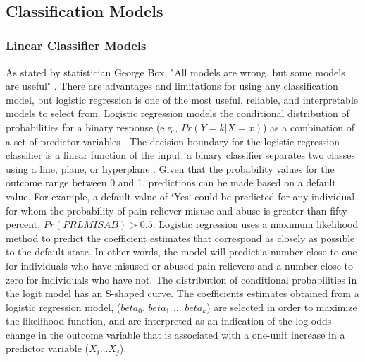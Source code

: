 \\\documentclass[sigconf]{acmart}
\begin{document}

\subsection{Classification Models}

\subsubsection{Linear Classifier Models}

As stated by statistician George Box, "All models are wrong, but some models 
are useful" \cite{box05}. There are advantages and limitations for using any 
classification model, but logistic regression is one of the most useful,
reliable, and interpretable models to select from. Logistic regression models 
the conditional distribution of probabilities for a binary response (e.g., 
$Pr(Y=k | X=x)$) as a combination of a set of predictor variables 
\cite{james13, raschka17}. The decision boundary for the logistic regression 
classifier is a linear function of the input; a binary classifier separates 
two classes using a line, plane, or hyperplane \cite{muller17}. Given that the 
probability values for the outcome range between 0 and 1, predictions can be 
made based on a default value. For example, a default value of `Yes` could be 
predicted for any individual for whom the probability of pain reliever misuse 
and abuse is greater than fifty-percent, $Pr(PRLMISAB) > 0.5$. Logistic regression 
uses a maximum likelihood method to predict the coefficient estimates that 
correspond as closely as possible to the default state. In other words, the 
model will predict a number close to one for individuals who have misused or 
abused pain relievers and a number close to zero for individuals who have 
not. The distribution of conditional probabilities in the logit model has an 
S-shaped curve. The coefficients estimates obtained from a logistic regression 
model, ($beta_0$, $beta_1$ ... $beta_k$) are selected in order to maximize the 
likelihood function, and are interpreted as an indication of the log-odds 
change in the outcome variable that is associated with a one-unit increase 
in a predictor variable ($X_i$...$X_j$). 

\end{document}
